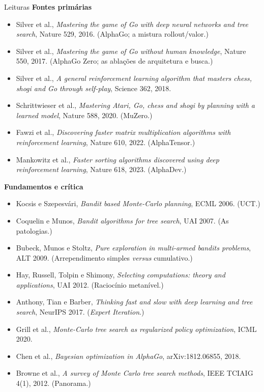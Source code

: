 \documentclass[aspectratio=169, 10pt]{beamer}
\begin{document}
\begin{frame}{Leituras}
  \scriptsize
  \textbf{Fontes primárias}
  \begin{itemize}\setlength{\itemsep}{0.15em}
    \item Silver et al., \emph{Mastering the game of Go with deep neural networks
          and tree search}, Nature 529, 2016. (AlphaGo; a mistura rollout/valor.)
    \item Silver et al., \emph{Mastering the game of Go without human knowledge},
          Nature 550, 2017. (AlphaGo Zero; as ablações de arquitetura e busca.)
    \item Silver et al., \emph{A general reinforcement learning algorithm that
          masters chess, shogi and Go through self-play}, Science 362, 2018.
    \item Schrittwieser et al., \emph{Mastering Atari, Go, chess and shogi by
          planning with a learned model}, Nature 588, 2020. (MuZero.)
    \item Fawzi et al., \emph{Discovering faster matrix multiplication algorithms
          with reinforcement learning}, Nature 610, 2022. (AlphaTensor.)
    \item Mankowitz et al., \emph{Faster sorting algorithms discovered using deep
          reinforcement learning}, Nature 618, 2023. (AlphaDev.)
  \end{itemize}

  \medskip
  \textbf{Fundamentos e crítica}
  \begin{itemize}\setlength{\itemsep}{0.15em}
    \item Kocsis e Szepesvári, \emph{Bandit based Monte-Carlo planning}, ECML 2006. (UCT.)
    \item Coquelin e Munos, \emph{Bandit algorithms for tree search}, UAI 2007. (As patologias.)
    \item Bubeck, Munos e Stoltz, \emph{Pure exploration in multi-armed bandits
          problems}, ALT 2009. (Arrependimento simples \emph{versus} cumulativo.)
    \item Hay, Russell, Tolpin e Shimony, \emph{Selecting computations: theory and
          applications}, UAI 2012. (Raciocínio metanível.)
    \item Anthony, Tian e Barber, \emph{Thinking fast and slow with deep learning
          and tree search}, NeurIPS 2017. (\emph{Expert Iteration}.)
    \item Grill et al., \emph{Monte-Carlo tree search as regularized policy
          optimization}, ICML 2020.
    \item Chen et al., \emph{Bayesian optimization in AlphaGo}, arXiv:1812.06855, 2018.
    \item Browne et al., \emph{A survey of Monte Carlo tree search methods},
          IEEE TCIAIG 4(1), 2012. (Panorama.)
  \end{itemize}
\end{frame}
\end{document}
